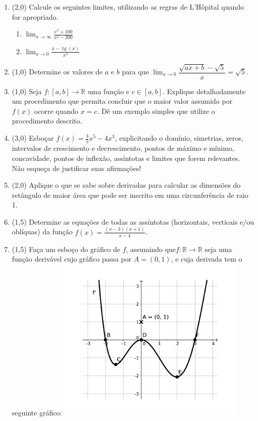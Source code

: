 \documentclass[12pt,a4paper]{article}
\newcommand*\tg{\operatorname{tg}}
\newcommand*\R{\mathbb{R}}
\begin{document}
\begin{enumerate}

\item (2,0) Calcule os seguintes limites, utilizando as regras de L'Hôpital quando for apropriado.
\begin{multicols}{2}
\begin{enumerate}
\item $\displaystyle\lim_{x\to\infty} \frac{e^x + 100}{x^2 - 200}$
\item $\displaystyle\lim_{x\to 0} \frac{x-\tg(x)}{x^3}$
\end{enumerate}
\end{multicols}

\item (1,0) Determine os valores de $a$ e $b$ para que $\lim_{x\to0} \dfrac{\sqrt{ax+b}-\sqrt{5}}{x} = \sqrt{5}$.

\item (1,0) Seja $f: [a, b] \to \R$ uma função e $c \in [a, b]$. Explique detalhadamente um procedimento que permita concluir que o maior valor assumido por $f(x)$ ocorre quando $x = c$. Dê um exemplo simples que utilize o procedimento descrito.

\item (3,0) Esboçar $f(x) = \frac{3}{5}x^5 - 4x^3$, explicitando o domínio, simetrias, zeros, intervalos de crescimento e decrescimento, pontos de máximo e mínimo, concavidade, pontos de inflexão, assíntotas e limites que forem relevantes. Não esqueça de justificar suas afirmações!

\item (2,0) Aplique o que se sabe sobre derivadas para calcular as dimensões do retângulo de maior área que pode ser inscrito em uma circunferência de raio 1.

\item (1,5) Determine as equações de todas as assíntotas (horizontais, verticais e/ou oblíquas) da função $f(x) = \frac{(x-3)(x+1)}{x-4}$.

\item (1,5) Faça um esboço do gráfico de $f$, assumindo que$f: \R \to \R$ seja uma função derivável cujo gráfico passa por $A=(0, 1)$, e cuja derivada tem o seguinte gráfico:
\includegraphics[width=9.0cm]{img/prova-3-nex-grafico-f'}

\end{enumerate}

\end{document}
